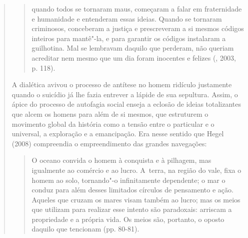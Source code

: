 {\begin{quote}
\begin{quote}
quando todos se tornaram maus, começaram a falar em fraternidade e
humanidade e entenderam essas ideias. Quando se tornaram criminosos,
conceberam a justiça e prescreveram a si mesmos códigos inteiros para
mantê"-la, e para garantir os códigos instalaram a guilhotina. Mal se
lembravam daquilo que perderam, não queriam acreditar nem mesmo que um
dia foram inocentes e felizes (, 2003, p. 118).
\end{quote}

A dialética avivou o processo de antítese no homem ridículo justamente
quando o suicídio já lhe fazia entrever a lápide de sua sepultura.
Assim, o ápice do processo de autofagia social enseja a eclosão de
ideias totalizantes que alcem os homens para além de si mesmos, que
estruturem o movimento global da história como a tensão entre o
particular e o universal, a exploração e a emancipação. Era nesse
sentido que Hegel (2008) compreendia o empreendimento das grandes
navegações:

\begin{quote}
O oceano convida o homem à conquista e à pilhagem, mas igualmente ao
comércio e ao lucro. A~terra, na região do vale, fixa o homem ao solo,
tornando"-o infinitamente dependente; o mar o conduz para além desses
limitados círculos de pensamento e ação. Aqueles que cruzam os mares
visam também ao lucro; mas os meios que utilizam para realizar esse
intento são paradoxais: arriscam a propriedade e a própria vida. Os
meios são, portanto, o oposto daquilo que tencionam (pp. 80-81).
\end{quote}


\end{quote}}
